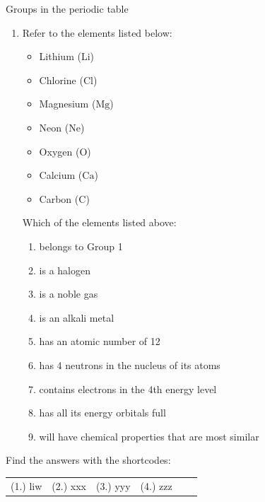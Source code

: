 \begin{exercises}{Groups in the periodic table}
\begin{enumerate}[noitemsep, label=\textbf{\arabic*}. ]
\item            \label{m38760*id262476}Refer to the elements listed below: \label{m38760*id7632}\begin{itemize}[noitemsep]
            \item Lithium ($\mathrm{Li}$)\item Chlorine ($\mathrm{Cl}$)\item Magnesium ($\mathrm{Mg}$)\item Neon ($\mathrm{Ne}$)\item Oxygen ($\mathrm{O}$)\item Calcium ($\mathrm{Ca}$)\item Carbon ($\mathrm{C}$)\end{itemize}
         Which of the elements listed above:
        \label{m38760*id262499}\begin{enumerate}[noitemsep, label=\textbf{\alph*}. ] 
            \label{m38760*uid158}\item belongs to Group 1
\label{m38760*uid159}\item is a halogen
\label{m38760*uid160}\item is a noble gas
\label{m38760*uid161}\item is an alkali metal
\label{m38760*uid162}\item has an atomic number of 12
\label{m38760*uid163}\item has 4 neutrons in the nucleus of its atoms
\label{m38760*uid164}\item contains electrons in the 4th energy level
\label{m38760*uid166}\item has all its energy orbitals full
\label{m38760*uid167}\item will have chemical properties that are most similar
\end{enumerate}
\end{enumerate}
         \par 
\label{m38760**end}
\par {} Find the answers with the shortcodes:
 \par \begin{tabular}[h]{cccccc}
 (1.) liw  & (2.) xxx & (3.) yyy & (4.) zzz \end{tabular}

\end{exercises}
        \par 
